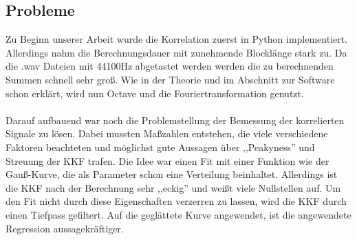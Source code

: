 \subsection{Probleme} 
Zu Beginn unserer Arbeit wurde die Korrelation zuerst in Python implementiert. Allerdings nahm die Berechnungsdauer mit zunehmende Blocklänge stark zu. Da die .wav Dateien mit 44100Hz abgetastet werden werden die zu berechnenden Summen schnell sehr groß. Wie in der Theorie und im Abschnitt zur Software schon erklärt, wird nun Octave und die Fouriertransformation genutzt. \\\\Darauf aufbauend war noch die Problemstellung der Bemessung der korrelierten Signale zu lösen. Dabei mussten Maßzahlen entstehen, die viele verschiedene Faktoren beachteten und möglichst gute Aussagen über ,,Peakyness'' und Streuung der KKF trafen. Die Idee war einen Fit mit einer Funktion wie der Gauß-Kurve, die als Parameter schon eine Verteilung beinhaltet. Allerdings ist die KKF nach der Berechnung sehr ,,eckig'' und weißt viele Nullstellen auf. Um den Fit nicht durch diese Eigenschaften verzerren zu lassen, wird die KKF durch einen Tiefpass gefiltert. Auf die geglättete Kurve angewendet, ist die angewendete Regression aussagekräftiger.
